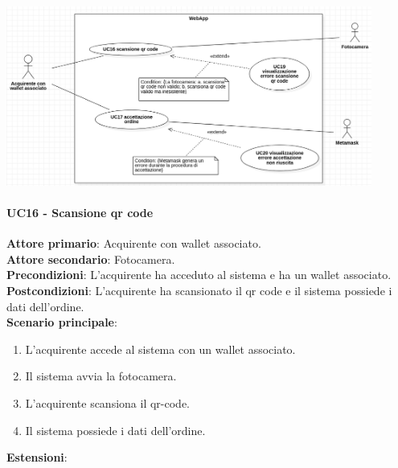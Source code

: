 \documentclass[a4paper, 12pt]{article}
\begin{document}
\includegraphics[width=0.9\textwidth]{UseCase_webapp3}

\paragraph{UC16 - Scansione qr code}
\textbf{Attore primario}: Acquirente con wallet associato.\\
\textbf{Attore secondario}: Fotocamera.\\
\textbf{Precondizioni}: L'acquirente ha acceduto al sistema e ha un wallet associato.\\
\textbf{Postcondizioni}: L'acquirente ha scansionato il qr code e il sistema possiede i dati dell'ordine.\\
\textbf{Scenario principale}:
\begin{enumerate}
    \item L'acquirente accede al sistema con un wallet associato.
    \item Il sistema avvia la fotocamera.
    \item L'acquirente scansiona il qr-code.
    \item Il sistema possiede i dati dell'ordine.
\end{enumerate}
\textbf{Estensioni}:
\end{document}
